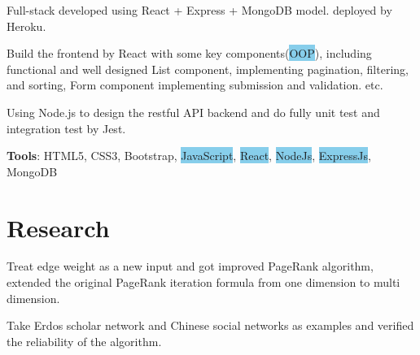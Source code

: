 \documentclass[letterpaper]{deedy-resume} %
\begin{document}
\begin{minipage}[t]{1\textwidth}
\vspace{\topsep} %
\begin{tightitemize}
	\item Full-stack developed using React + Express + MongoDB model.
	deployed by Heroku.
	\item Build the frontend by React with some key components(\colorbox{SkyBlue}{OOP}), including functional and well designed List component, implementing pagination, filtering, and sorting, Form component implementing submission and validation. etc.
	\item Using Node.js to design the restful API backend and do fully unit test and integration test by Jest.
	\item \textbf{Tools}: HTML5, CSS3, Bootstrap, \colorbox{SkyBlue}{JavaScript}, \colorbox{SkyBlue}{React}, \colorbox{SkyBlue}{NodeJs}, \colorbox{SkyBlue}{ExpressJs}, MongoDB
\end{tightitemize}
\section{Research}

\descript{}

\vspace{\topsep} %
\begin{tightitemize}
	\item Treat edge weight as a new input and got improved PageRank algorithm, extended the original PageRank iteration formula from one dimension to multi dimension.
	\item Take Erdos scholar network and Chinese social networks as examples and verified the reliability of the algorithm.
\end{tightitemize}

\end{minipage} %

\end{document}
